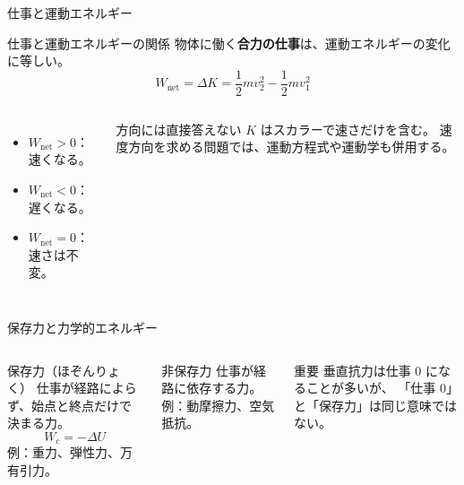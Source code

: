 \documentclass[notheorems,aspectratio=169]{beamer}
\newcommand{\key}[1]{\textbf{\color{ChinaRed}#1}}
\begin{document}
\begin{frame}{仕事と運動エネルギー}
  \begin{block}{仕事と運動エネルギーの関係}
    物体に働く\key{合力の仕事}は、運動エネルギーの変化に等しい。
    \[
      \boxed{W_{\mathrm{net}}=\Delta K
      =\frac12mv_2^2-\frac12mv_1^2}
    \]
  \end{block}

  \begin{columns}[T,onlytextwidth]
    \begin{itemize}
      \item $W_{\mathrm{net}}>0$：速くなる。
      \item $W_{\mathrm{net}}<0$：遅くなる。
      \item $W_{\mathrm{net}}=0$：速さは不変。
    \end{itemize}
    \begin{alertblock}{方向には直接答えない}
      $K$ はスカラーで速さだけを含む。
      速度方向を求める問題では、運動方程式や運動学も併用する。
    \end{alertblock}
  \end{columns}
\end{frame}

\begin{frame}{保存力と力学的エネルギー}
  \begin{columns}[T,onlytextwidth]
    \begin{block}{保存力（ほぞんりょく）}
      仕事が経路によらず、始点と終点だけで決まる力。
      \[
        W_c=-\Delta U
      \]
      例：重力、弾性力、万有引力。
    \end{block}
    \begin{block}{非保存力}
      仕事が経路に依存する力。
      例：動摩擦力、空気抵抗。
    \end{block}
    \begin{alertblock}{重要}
      垂直抗力は仕事 0 になることが多いが、
      「仕事 0」と「保存力」は同じ意味ではない。
    \end{alertblock}
  \end{columns}
\end{frame}
\end{document}
